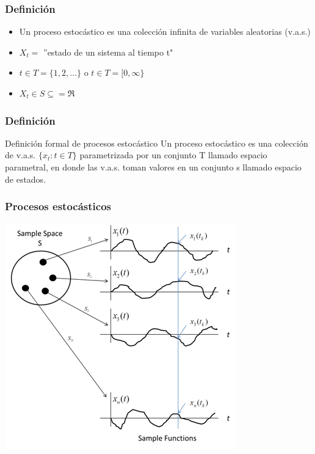 \documentclass[spanish]{beamer}
\begin{document}
\begin{frame}
\frametitle{Definición}
\begin{itemize}
\item Un proceso estocástico es una colección infinita de variables aleatorias (v.a.s.)
\item $X_{t} =$ ''estado de un sistema al tiempo t"
\item $t\in T= \lbrace 1,2, \ldots \rbrace$ o $t\in T = [0,\infty \rbrace$ 
\item $X_{t} \in S  \subseteq = \mathfrak{R}$ 
\end{itemize}
\end{frame}
\begin{frame}
\frametitle{Definición}
\begin{block}{Definición formal de procesos estocástico}
Un proceso estocástico es una colección de v.a.s. $\lbrace x_{t}: t \in T \rbrace$ parametrizada por un conjunto T llamado espacio parametral, en donde las v.a.s. toman valores en un conjunto s llamado espacio de estados. 
\end{block}

\end{frame}
\begin{frame}
\frametitle{Procesos estocásticos}
\begin{center}
\includegraphics[scale=0.6]{im3}
\end{center}
\end{frame}
\end{document}
